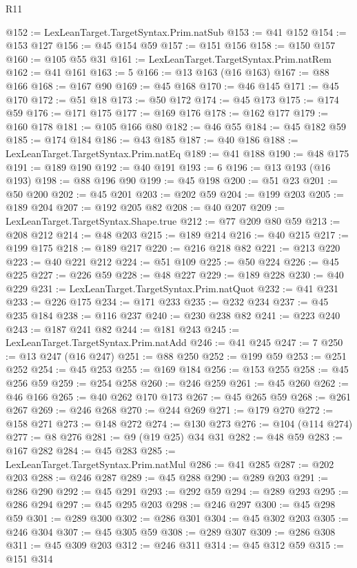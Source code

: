\begin{lexlean}{R11}
\begin{coremodule}
@152 := LexLeanTarget.TargetSyntax.Prim.natSub
@153 := @41 @152
@154 := @153 @127
@156 := @45 @154 @59
@157 := @151 @156
@158 := @150 @157
@160 := @105 @55 @31
@161 := LexLeanTarget.TargetSyntax.Prim.natRem
@162 := @41 @161
@163 := 5
@166 := @13 @163 (@16 @163)
@167 := @88 @166
@168 := @167 @90
@169 := @45 @168
@170 := @46 @145
@171 := @45 @170
@172 := @51 @18
@173 := @50 @172
@174 := @45 @173
@175 := @174 @59
@176 := @171 @175
@177 := @169 @176
@178 := @162 @177
@179 := @160 @178
@181 := @105 @166 @80
@182 := @46 @55
@184 := @45 @182 @59
@185 := @174 @184
@186 := @43 @185
@187 := @40 @186
@188 := LexLeanTarget.TargetSyntax.Prim.natEq
@189 := @41 @188
@190 := @48 @175
@191 := @189 @190
@192 := @40 @191
@193 := 6
@196 := @13 @193 (@16 @193)
@198 := @88 @196 @90
@199 := @45 @198
@200 := @51 @23
@201 := @50 @200
@202 := @45 @201
@203 := @202 @59
@204 := @199 @203
@205 := @189 @204
@207 := @192 @205 @82
@208 := @40 @207
@209 := LexLeanTarget.TargetSyntax.Shape.true
@212 := @77 @209 @80 @59
@213 := @208 @212
@214 := @48 @203
@215 := @189 @214
@216 := @40 @215
@217 := @199 @175
@218 := @189 @217
@220 := @216 @218 @82
@221 := @213 @220
@223 := @40 @221 @212
@224 := @51 @109
@225 := @50 @224
@226 := @45 @225
@227 := @226 @59
@228 := @48 @227
@229 := @189 @228
@230 := @40 @229
@231 := LexLeanTarget.TargetSyntax.Prim.natQuot
@232 := @41 @231
@233 := @226 @175
@234 := @171 @233
@235 := @232 @234
@237 := @45 @235 @184
@238 := @116 @237
@240 := @230 @238 @82
@241 := @223 @240
@243 := @187 @241 @82
@244 := @181 @243
@245 := LexLeanTarget.TargetSyntax.Prim.natAdd
@246 := @41 @245
@247 := 7
@250 := @13 @247 (@16 @247)
@251 := @88 @250
@252 := @199 @59
@253 := @251 @252
@254 := @45 @253
@255 := @169 @184
@256 := @153 @255
@258 := @45 @256 @59
@259 := @254 @258
@260 := @246 @259
@261 := @45 @260
@262 := @46 @166
@265 := @40 @262 @170 @173
@267 := @45 @265 @59
@268 := @261 @267
@269 := @246 @268
@270 := @244 @269
@271 := @179 @270
@272 := @158 @271
@273 := @148 @272
@274 := @130 @273
@276 := @104 (@114 @274)
@277 := @8 @276
@281 := @9 (@19 @25) @34 @31
@282 := @48 @59
@283 := @167 @282
@284 := @45 @283
@285 := LexLeanTarget.TargetSyntax.Prim.natMul
@286 := @41 @285
@287 := @202 @203
@288 := @246 @287
@289 := @45 @288
@290 := @289 @203
@291 := @286 @290
@292 := @45 @291
@293 := @292 @59
@294 := @289 @293
@295 := @286 @294
@297 := @45 @295 @203
@298 := @246 @297
@300 := @45 @298 @59
@301 := @289 @300
@302 := @286 @301
@304 := @45 @302 @203
@305 := @246 @304
@307 := @45 @305 @59
@308 := @289 @307
@309 := @286 @308
@311 := @45 @309 @203
@312 := @246 @311
@314 := @45 @312 @59
@315 := @151 @314

\end{coremodule}
\end{lexlean}
